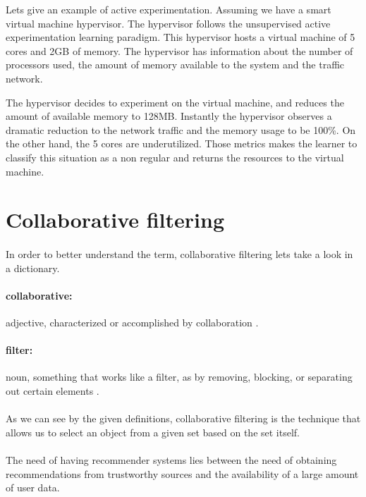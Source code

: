 \begin{description}
	Lets give an example of active experimentation. Assuming we have a smart virtual machine hypervisor. The hypervisor follows the unsupervised active experimentation learning paradigm. This hypervisor hosts a virtual machine of 5 cores and 2GB of memory. The hypervisor has information about the number of processors used, the amount of memory available to the system and the traffic network.
	
	The hypervisor decides to experiment on the virtual machine, and reduces the amount of available memory to 128MB. Instantly the hypervisor observes a dramatic reduction to the network traffic and the memory usage to be 100\%. On the other hand, the 5 cores are underutilized. Those metrics makes the learner to classify this situation as a non regular and returns the resources to the virtual machine.
	
\end{description}

\section{Collaborative filtering}
\paragraph{} In order to better understand the term, collaborative filtering lets take a look in a dictionary.
\paragraph{collaborative:} adjective, characterized or accomplished by collaboration \cite{Dictionary.com2017}.
\paragraph{filter:} noun, something that works like a filter, as by removing, blocking, or separating out certain elements \cite{Dictionary.com2017}.
\paragraph{} As we can see by the given definitions, collaborative filtering is the technique that allows us to select an object from a given set based on the set itself.
\paragraph{}The need of having recommender systems lies between the need of obtaining recommendations from trustworthy sources and the availability of a large amount of user data.
